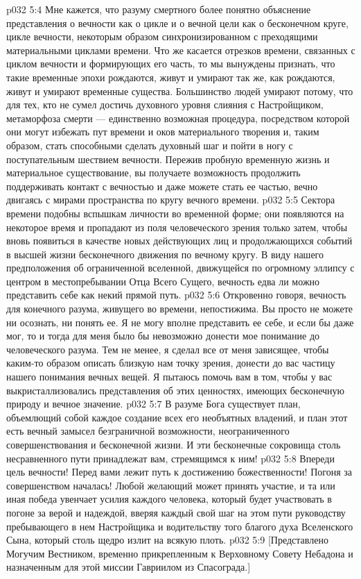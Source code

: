 \vs p032 5:4 Мне кажется, что разуму смертного более понятно объяснение представления о вечности как о цикле и о вечной цели как о бесконечном круге, цикле вечности, некоторым образом синхронизированном с преходящими материальными циклами времени. Что же касается отрезков времени, связанных с циклом вечности и формирующих его часть, то мы вынуждены признать, что такие временные эпохи рождаются, живут и умирают так же, как рождаются, живут и умирают временные существа. Большинство людей умирают потому, что для тех, кто не сумел достичь духовного уровня слияния с Настройщиком, метаморфоза смерти --- единственно возможная процедура, посредством которой они могут избежать пут времени и оков материального творения и, таким образом, стать способными сделать духовный шаг и пойти в ногу с поступательным шествием вечности. Пережив пробную временную жизнь и материальное существование, вы получаете возможность продолжить поддерживать контакт с вечностью и даже можете стать ее частью, вечно двигаясь с мирами пространства по кругу вечного времени.
\vs p032 5:5 Сектора времени подобны вспышкам личности во временной форме; они появляются на некоторое время и пропадают из поля человеческого зрения только затем, чтобы вновь появиться в качестве новых действующих лиц и продолжающихся событий в высшей жизни бесконечного движения по вечному кругу. В виду нашего предположения об ограниченной вселенной, движущейся по огромному эллипсу с центром в местопребывании Отца Всего Сущего, вечность едва ли можно представить себе как некий прямой путь.
\vs p032 5:6 Откровенно говоря, вечность для конечного разума, живущего во времени, непостижима. Вы просто не можете ни осознать, ни понять ее. Я не могу вполне представить ее себе, и если бы даже мог, то и тогда для меня было бы невозможно донести мое понимание до человеческого разума. Тем не менее, я сделал все от меня зависящее, чтобы каким\hyp{}то образом описать близкую нам точку зрения, донести до вас частицу нашего понимания вечных вещей. Я пытаюсь помочь вам в том, чтобы у вас выкристаллизовались представления об этих ценностях, имеющих бесконечную природу и вечное значение.
\vs p032 5:7 \pc В разуме Бога существует план, объемлющий собой каждое создание всех его необъятных владений, и план этот есть вечный замысел безграничной возможности, неограниченного совершенствования и бесконечной жизни. И эти бесконечные сокровища столь несравненного пути принадлежат вам, стремящимся к ним!
\vs p032 5:8 Впереди цель вечности! Перед вами лежит путь к достижению божественности! Погоня за совершенством началась! Любой желающий может принять участие, и та или иная победа увенчает усилия каждого человека, который будет участвовать в погоне за верой и надеждой, вверяя каждый свой шаг на этом пути руководству пребывающего в нем Настройщика и водительству того благого духа Вселенского Сына, который столь щедро излит на всякую плоть.
\vsetoff
\vs p032 5:9 [Представлено Могучим Вестником, временно прикрепленным к Верховному Совету Небадона и назначенным для этой миссии Гавриилом из Спасограда.]
